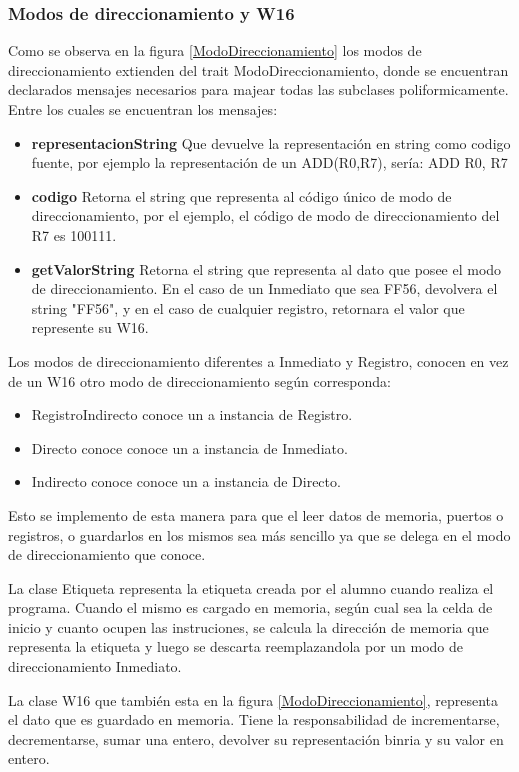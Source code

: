 \subsubsection{Modos de direccionamiento y W16}
Como se observa en la figura \ref{ModoDireccionamiento} los modos de direccionamiento extienden del trait ModoDireccionamiento, donde se encuentran declarados mensajes necesarios para majear todas las subclases poliformicamente. Entre los cuales se encuentran los mensajes: 
\begin{itemize}
\item  \textbf{representacionString}
Que devuelve la representación en string como codigo fuente, por ejemplo la representación de un ADD(R0,R7), sería: ADD R0, R7
\item  \textbf{codigo}
Retorna el string que representa al código único de modo de direccionamiento, por el ejemplo, el código de modo de direccionamiento del R7 es 100111.
\item  \textbf{getValorString}
Retorna el string que representa al dato que posee el modo de direccionamiento. En el caso de un Inmediato que sea FF56, devolvera el string "FF56", y en el caso de cualquier registro, retornara el valor que represente su W16.
\end{itemize}
Los modos de direccionamiento diferentes a Inmediato y Registro, conocen en vez de un W16 otro modo de direccionamiento según corresponda:
\begin{itemize}
\item RegistroIndirecto conoce un a instancia de Registro.
\item Directo conoce conoce un a instancia de Inmediato.
\item Indirecto conoce conoce un a instancia de Directo.
\end{itemize}
Esto se implemento de esta manera para que el leer datos de memoria, puertos o registros, o guardarlos en los mismos sea más sencillo ya que se delega en el modo de direccionamiento que conoce.

La clase Etiqueta representa la etiqueta creada por el alumno cuando realiza el programa. Cuando el mismo es cargado en memoria, según cual sea la celda de inicio y cuanto ocupen las instruciones, se calcula la dirección de memoria que representa la etiqueta y luego se descarta reemplazandola por un modo de direccionamiento Inmediato.

La clase W16 que también esta en la figura \ref{ModoDireccionamiento}, representa el dato que es guardado en memoria. Tiene la responsabilidad de incrementarse, decrementarse, sumar una entero, devolver su representación binria y su valor en entero.



